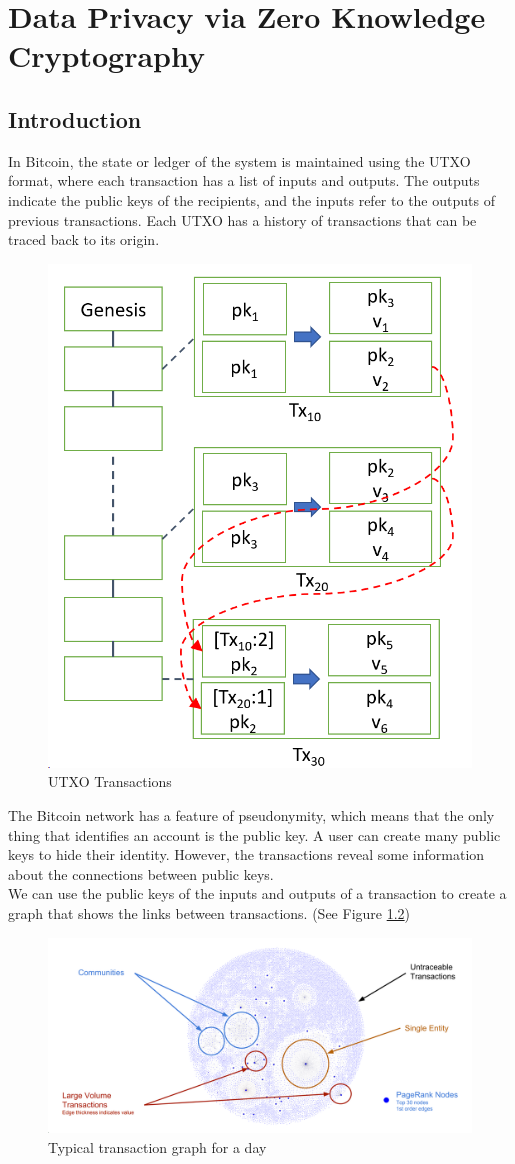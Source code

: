 \chapter{Data Privacy via Zero Knowledge Cryptography}
\section{Introduction}
In Bitcoin, the state or ledger of the system is maintained using the UTXO format, where each transaction has a list of inputs and outputs. The outputs indicate the public keys of the recipients, and the inputs refer to the outputs of previous transactions. Each UTXO has a history of transactions that can be traced back to its origin.
\begin{figure}[h!]
	\centering
	\includegraphics[width=0.25\linewidth]{Fig/19/F1}
	\caption{UTXO Transactions}
	\label{fig:L19_f1}
\end{figure}
The Bitcoin network has a feature of pseudonymity, which means that the only thing that identifies an account is the public key. A user can create many public keys to hide their identity. However, the transactions reveal some information about the connections between public keys.\\
We can use the public keys of the inputs and outputs of a transaction to create a graph that shows the links between transactions. (See Figure \ref{fig:L19_f2})
\begin{figure}[h!]
	\centering
	\includegraphics[width=0.8\linewidth]{Fig/19/F2}
	\caption{Typical transaction graph for a day}
	\label{fig:L19_f2}
\end{figure}

